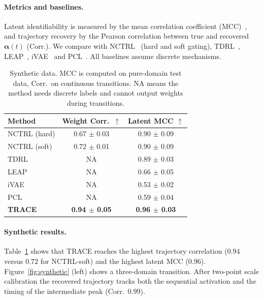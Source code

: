 \documentclass[sigconf,nonacm]{acmart}
\theoremstyle{plain}
\theoremstyle{definition}
\newcommand{\va}{\boldsymbol{\alpha}}
\begin{document}
\paragraph{Metrics and baselines.} Latent identifiability is measured by the mean correlation coefficient (MCC)~\citep{hyvarinen2016unsupervised}, and trajectory recovery by the Pearson correlation between true and recovered $\va(t)$ (Corr.). We compare with NCTRL~\citep{song2023temporally} (hard and soft gating), TDRL~\citep{yaoTemporallyDisentangledRepresentation2022}, LEAP~\citep{yao2021learning}, iVAE~\citep{khemakhem2020variational} and PCL~\citep{hyvarinen2017nonlinear}. All baselines assume discrete mechanisms.

\begin{table}[t]
\caption{Synthetic data. MCC is computed on pure-domain test data, Corr.\ on continuous transitions. NA means the method needs discrete labels and cannot output weights during transitions.}
\label{tab:synthetic}
\centering
\small
\begin{tabular}{lcc}
\toprule
Method & Weight Corr.\ $\uparrow$ & Latent MCC $\uparrow$ \\
\midrule
NCTRL (hard) & 0.67 $\pm$ 0.03 & 0.90 $\pm$ 0.09 \\
NCTRL (soft) & 0.72 $\pm$ 0.01 & 0.90 $\pm$ 0.09 \\
TDRL & NA & 0.89 $\pm$ 0.03 \\
LEAP & NA & 0.66 $\pm$ 0.05 \\
iVAE & NA & 0.53 $\pm$ 0.02 \\
PCL & NA & 0.59 $\pm$ 0.04 \\
\textbf{TRACE} & \textbf{0.94 $\pm$ 0.05} & \textbf{0.96 $\pm$ 0.03} \\
\bottomrule
\end{tabular}
\end{table}

\paragraph{Synthetic results.}
Table~\ref{tab:synthetic} shows that TRACE reaches the highest trajectory correlation ($0.94$ versus $0.72$ for NCTRL-soft) and the highest latent MCC ($0.96$). Figure~\ref{fig:synthetic} (left) shows a three-domain transition. After two-point scale calibration the recovered trajectory tracks both the sequential activation and the timing of the intermediate peak (Corr.\ $0.99$).
\end{document}
